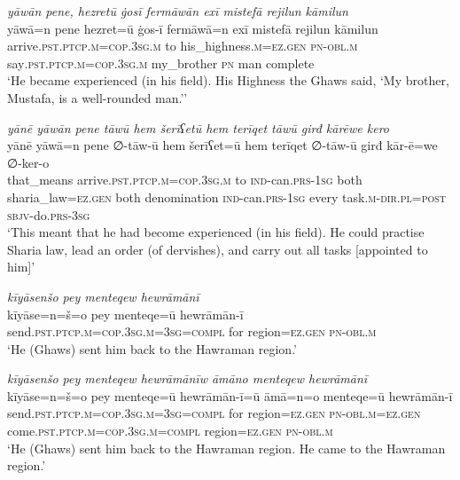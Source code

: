 \ea \label{ZP.18}
\textit{yāwān pene, hezretū ġosī fermāwān exī mistefā rejilun kāmilun} \\ 
\gll yāwā=n pene hezret=ū ġos-ī fermāwā=n exī mistefā rejilun kāmilun \\ 
 arrive\textsc{.pst}\textsc{.ptcp}\textsc{.m}\textsc{=cop}\textsc{.3sg}\textsc{.m} to his\_highness\textsc{.m}\textsc{\textsc{=ez.gen}} \textsc{pn}\textsc{-obl}\textsc{.m} say\textsc{.pst}\textsc{.ptcp}\textsc{.m}\textsc{=cop}\textsc{.3sg}\textsc{.m} my\_brother \textsc{pn} man complete \\ 
\glt `He became experienced (in his field). His Highness the Ghaws said, ‘My brother, Mustafa, is a well-rounded man.’'
\z 
 
\ea \label{ZP.19}
\textit{yānē yāwān pene tāwū hem šerīʕetū hem terīqet tāwū girđ kārēwe kero} \\ 
\gll yānē yāwā=n pene ∅-tāw-ū hem šerīʕet=ū hem terīqet ∅-tāw-ū girđ kār-ē=we ∅-ker-o \\ 
 that\_means arrive\textsc{.pst}\textsc{.ptcp}\textsc{.m}\textsc{=cop}\textsc{.3sg}\textsc{.m} to \textsc{ind-}can\textsc{.prs}\textsc{-\textsc{1sg}} both sharia\_law\textsc{\textsc{=ez.gen}} both denomination \textsc{ind-}can\textsc{.prs}\textsc{-\textsc{1sg}} every task\textsc{.m}\textsc{-dir}\textsc{.pl}\textsc{=\textsc{post}} \textsc{sbjv-}do\textsc{.prs}\textsc{-3sg} \\ 
\glt `This meant that he had become experienced (in his field). He could practise Sharia law, lead an order (of dervishes), and carry out all tasks [appointed to him]'
\z 
 
\ea \label{ZP.20}
\textit{kīyāsenšo pey menteqew hewrāmānī} \\ 
\gll kīyāse=n=š=o pey menteqe=ū hewrāmān-ī \\ 
 send\textsc{.pst}\textsc{.ptcp}\textsc{.m}\textsc{=cop}\textsc{.3sg}\textsc{.m}\textsc{=3sg}\textsc{=compl} for region\textsc{\textsc{=ez.gen}} \textsc{pn}\textsc{-obl}\textsc{.m} \\ 
\glt `He (Ghaws) sent him back to the Hawraman region.'
\z 
 
\ea \label{ZP.21}
\textit{kīyāsenšo pey menteqew hewrāmānīw āmāno menteqew hewrāmānī} \\ 
\gll kīyāse=n=š=o pey menteqe=ū hewrāmān-ī=ū āmā=n=o menteqe=ū hewrāmān-ī \\ 
 send\textsc{.pst}\textsc{.ptcp}\textsc{.m}\textsc{=cop}\textsc{.3sg}\textsc{.m}\textsc{=3sg}\textsc{=compl} for region\textsc{\textsc{=ez.gen}} \textsc{pn}\textsc{-obl}\textsc{.m}\textsc{\textsc{=ez.gen}} come\textsc{.pst}\textsc{.ptcp}\textsc{.m}\textsc{=cop}\textsc{.3sg}\textsc{.m}\textsc{=compl} region\textsc{\textsc{=ez.gen}} \textsc{pn}\textsc{-obl}\textsc{.m} \\ 
\glt `He (Ghaws) sent him back to the Hawraman region. He came to the Hawraman region.'
\z 
 
